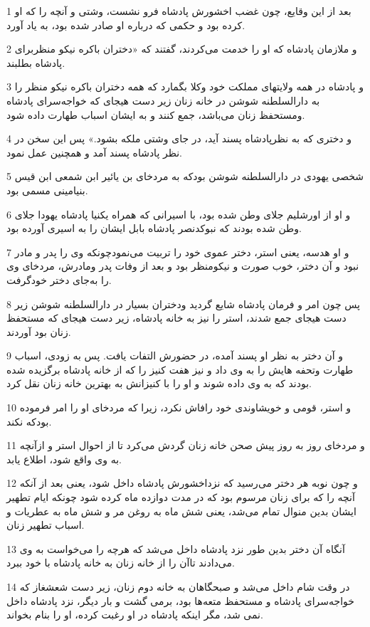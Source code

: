 \par 1 بعد از این وقایع، چون غضب اخشورش پادشاه فرو نشست، وشتی و آنچه را که او کرده بود و حکمی که درباره او صادر شده بود، به یاد آورد.
\par 2 و ملازمان پادشاه که او را خدمت می‌کردند، گفتند که «دختران باکره نیکو منظربرای پادشاه بطلبند.
\par 3 و پادشاه در همه ولایتهای مملکت خود وکلا بگمارد که همه دختران باکره نیکو منظر را به دارالسلطنه شوشن در خانه زنان زیر دست هیجای که خواجه‌سرای پادشاه ومستحفظ زنان می‌باشد، جمع کنند و به ایشان اسباب طهارت داده شود.
\par 4 و دختری که به نظرپادشاه پسند آید، در جای وشتی ملکه بشود.» پس این سخن در نظر پادشاه پسند آمد و همچنین عمل نمود.
\par 5 شخصی یهودی در دارالسلطنه شوشن بودکه به مردخای بن یائیر ابن شمعی ابن قیس بنیامینی مسمی بود.
\par 6 و او از اورشلیم جلای وطن شده بود، با اسیرانی که همراه یکنیا پادشاه یهودا جلای وطن شده بودند که نبوکدنصر پادشاه بابل ایشان را به اسیری آورده بود.
\par 7 و او هدسه، یعنی استر، دختر عموی خود را تربیت می‌نمودچونکه وی را پدر و مادر نبود و آن دختر، خوب صورت و نیکومنظر بود و بعد از وفات پدر ومادرش، مردخای وی را به‌جای دختر خودگرفت.
\par 8 پس چون امر و فرمان پادشاه شایع گردید ودختران بسیار در دارالسلطنه شوشن زیر دست هیجای جمع شدند، استر را نیز به خانه پادشاه، زیر دست هیجای که مستحفظ زنان بود آوردند.
\par 9 و آن دختر به نظر او پسند آمده، در حضورش التفات یافت. پس به زودی، اسباب طهارت وتحفه هایش را به وی داد و نیز هفت کنیز را که از خانه پادشاه برگزیده شده بودند که به وی داده شوند و او را با کنیزانش به بهترین خانه زنان نقل کرد.
\par 10 و استر، قومی و خویشاوندی خود رافاش نکرد، زیرا که مردخای او را امر فرموده بودکه نکند.
\par 11 و مردخای روز به روز پیش صحن خانه زنان گردش می‌کرد تا از احوال استر و ازآنچه به وی واقع شود، اطلاع یابد.
\par 12 و چون نوبه هر دختر می‌رسید که نزداخشورش پادشاه داخل شود، یعنی بعد از آنکه آنچه را که برای زنان مرسوم بود که در مدت دوازده ماه کرده شود چونکه ایام تطهیر ایشان بدین منوال تمام می‌شد، یعنی شش ماه به روغن مر و شش ماه به عطریات و اسباب تطهیر زنان.
\par 13 آنگاه آن دختر بدین طور نزد پادشاه داخل می‌شد که هر‌چه را می‌خواست به وی می‌دادند تاآن را از خانه زنان به خانه پادشاه با خود ببرد.
\par 14 در وقت شام داخل می‌شد و صبحگاهان به خانه دوم زنان، زیر دست شعشغاز که خواجه‌سرای پادشاه و مستحفظ متعه‌ها بود، برمی گشت و بار دیگر، نزد پادشاه داخل نمی شد، مگر اینکه پادشاه در او رغبت کرده، او را بنام بخواند.
